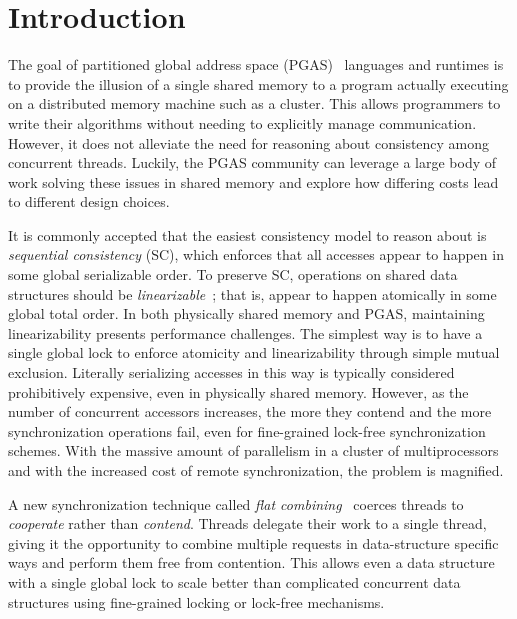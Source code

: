 \section{Introduction}
The goal of partitioned global address space (PGAS)~\cite{upc:2005} languages and runtimes is to provide the illusion of a single shared memory to a program actually executing on a distributed memory machine such as a cluster. This allows programmers to write their algorithms without needing to explicitly manage communication.
However, it does not alleviate the need for reasoning about consistency among concurrent threads.
Luckily, the PGAS community can leverage a large body of work solving these issues in shared memory and explore how differing costs lead to different design choices.

It is commonly accepted that the easiest consistency model to reason about is \emph{sequential consistency} (SC), which enforces that all accesses appear to happen in some global serializable order.
To preserve SC, operations on shared data structures should be \emph{linearizable}~\cite{herlihy1990linearizability}; that is, appear to happen atomically in some global total order.
In both physically shared memory and PGAS, maintaining linearizability presents performance challenges.
The simplest way is to have a single global lock to enforce atomicity and linearizability through simple mutual exclusion. Literally serializing accesses in this way is typically considered prohibitively expensive, even in physically shared memory.
However, as the number of concurrent accessors increases, the more they contend and the more synchronization operations fail, even for fine-grained lock-free synchronization schemes.
With the massive amount of parallelism in a cluster of multiprocessors and with the increased cost of remote synchronization, the problem is magnified.

A new synchronization technique called \emph{flat combining}~\cite{flatCombining} coerces threads to \emph{cooperate} rather than \emph{contend}.
Threads delegate their work to a single thread, giving it the opportunity to combine multiple requests in data-structure specific ways and perform them free from contention.
This allows even a data structure with a single global lock to scale better than complicated concurrent data structures using fine-grained locking or lock-free mechanisms.

